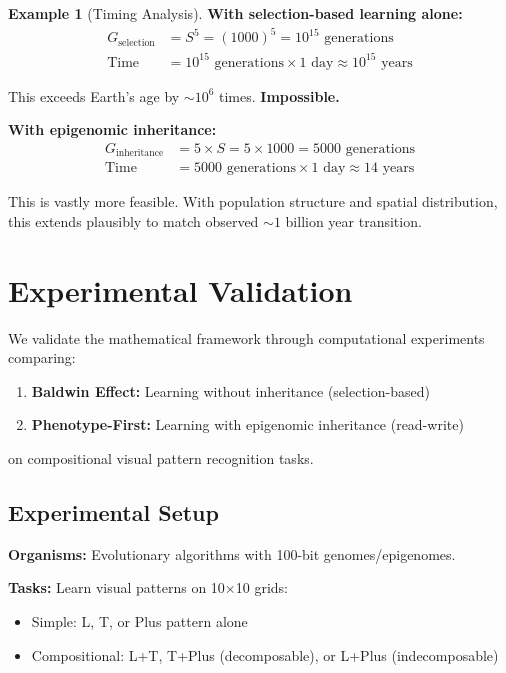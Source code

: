 \documentclass[11pt]{article}
\theoremstyle{definition}
\newtheorem{example}{Example}
\begin{document}
\begin{example}[Timing Analysis]

\textbf{With selection-based learning alone:}
\begin{align}
G_{\text{selection}} &= S^5 = (1000)^5 = 10^{15} \text{ generations} \\
\text{Time} &= 10^{15} \text{ generations} \times 1 \text{ day} \approx 10^{15} \text{ years}
\end{align}

This exceeds Earth's age by $\sim 10^6$ times. \textbf{Impossible.}

\textbf{With epigenomic inheritance:}
\begin{align}
G_{\text{inheritance}} &= 5 \times S = 5 \times 1000 = 5000 \text{ generations} \\
\text{Time} &= 5000 \text{ generations} \times 1 \text{ day} \approx 14 \text{ years}
\end{align}

This is vastly more feasible. With population structure and spatial distribution, this extends plausibly to match observed $\sim 1$ billion year transition.

\end{example}

\section{Experimental Validation}

We validate the mathematical framework through computational experiments comparing:

\begin{enumerate}
\item \textbf{Baldwin Effect:} Learning without inheritance (selection-based)
\item \textbf{Phenotype-First:} Learning with epigenomic inheritance (read-write)
\end{enumerate}

on compositional visual pattern recognition tasks.

\subsection{Experimental Setup}

\textbf{Organisms:} Evolutionary algorithms with 100-bit genomes/epigenomes.

\textbf{Tasks:} Learn visual patterns on 10×10 grids:
\begin{itemize}
\item Simple: L, T, or Plus pattern alone
\item Compositional: L+T, T+Plus (decomposable), or L+Plus (indecomposable)
\end{itemize}
\end{document}
